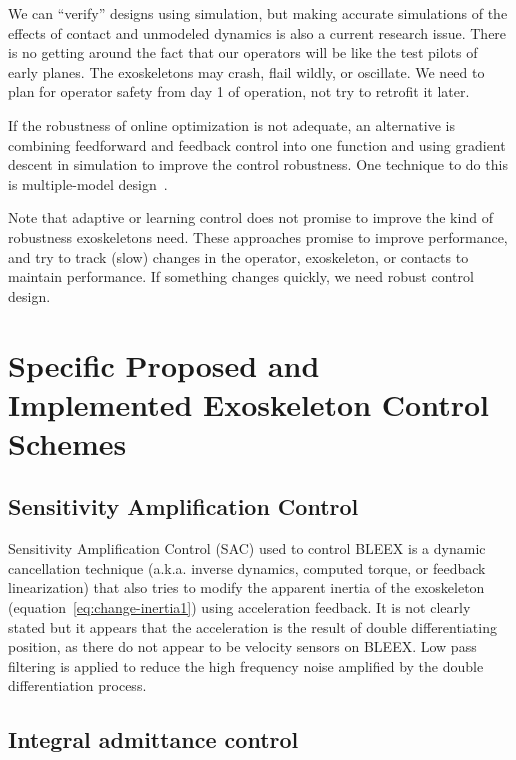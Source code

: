 \documentclass[letterpaper,12pt,fullpage]{article}
\begin{document}
We can ``verify'' designs using simulation, but making accurate simulations of
the effects of contact and unmodeled dynamics is also a current research issue.
There is no getting around the fact that our operators will be like the test
pilots of early planes. The exoskeletons may crash, flail wildly, or oscillate.
We need to plan for operator safety from day 1 of operation, not try to retrofit
it later.

If the robustness of online optimization is not adequate, an alternative is
combining feedforward and feedback control into one function and using gradient
descent in simulation to improve the control robustness.
One technique to do this is multiple-model design~\cite{acc12}.

Note that adaptive or learning
control does not promise to improve the kind of robustness exoskeletons need. 
These approaches promise
to improve performance, and try to track (slow) changes in the operator, exoskeleton,
or contacts to maintain performance. If something changes quickly, we need robust
control design.

\section{Specific Proposed and Implemented Exoskeleton Control Schemes}

\subsection{Sensitivity Amplification Control}

Sensitivity Amplification Control (SAC) used to control BLEEX
is a dynamic cancellation technique (a.k.a.
inverse dynamics, computed torque, or feedback linearization) that also tries
to modify the apparent inertia of the exoskeleton (equation~\ref{eq:change-inertia1})
using acceleration feedback. It is not clearly stated but it appears that the
acceleration is the result of double differentiating position, as there do not
appear to be velocity sensors on BLEEX. Low pass filtering is applied to reduce
the high frequency noise amplified by the double differentiation process.

\subsection{Integral admittance control}
\end{document}
